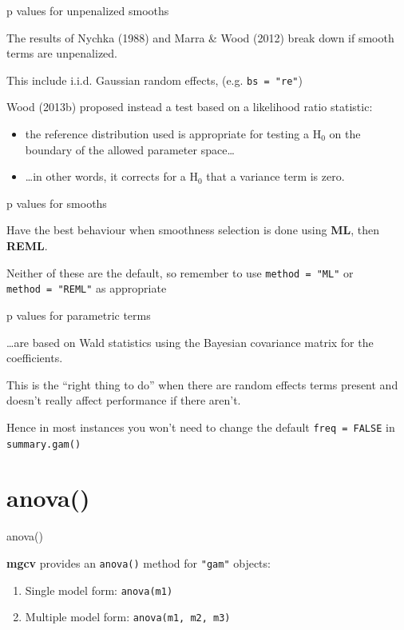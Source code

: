 \documentclass[10pt,ignorenonframetext,compress, aspectratio=169]{beamer}
\providecommand{\tightlist}{%
  \setlength{\itemsep}{0pt}\setlength{\parskip}{0pt}}
\begin{document}
\begin{frame}[fragile]{p values for unpenalized smooths}

The results of Nychka (1988) and Marra \& Wood (2012) break down if
smooth terms are unpenalized.

This include i.i.d. Gaussian random effects, (e.g. \texttt{bs\ =\ "re"})

Wood (2013b) proposed instead a test based on a likelihood ratio
statistic:

\begin{itemize}
\tightlist
\item
  the reference distribution used is appropriate for testing a
  \(\mathrm{H}_0\) on the boundary of the allowed parameter
  space\ldots{}
\item
  \ldots{}in other words, it corrects for a \(\mathrm{H}_0\) that a
  variance term is zero.
\end{itemize}

\end{frame}

\begin{frame}[fragile]{p values for smooths}

Have the best behaviour when smoothness selection is done using
\textbf{ML}, then \textbf{REML}.

Neither of these are the default, so remember to use
\texttt{method\ =\ "ML"} or \texttt{method\ =\ "REML"} as appropriate

\end{frame}

\begin{frame}[fragile]{p values for parametric terms}

\ldots{}are based on Wald statistics using the Bayesian covariance
matrix for the coefficients.

This is the ``right thing to do'' when there are random effects terms
present and doesn't really affect performance if there aren't.

Hence in most instances you won't need to change the default
\texttt{freq\ =\ FALSE} in \texttt{summary.gam()}

\end{frame}

\section{anova()}\label{anova}

\begin{frame}[fragile]{anova()}

\textbf{mgcv} provides an \texttt{anova()} method for \texttt{"gam"}
objects:

\begin{enumerate}
\def\labelenumi{\arabic{enumi}.}
\tightlist
\item
  Single model form: \texttt{anova(m1)}
\item
  Multiple model form: \texttt{anova(m1,\ m2,\ m3)}
\end{enumerate}

\end{frame}
\end{document}
